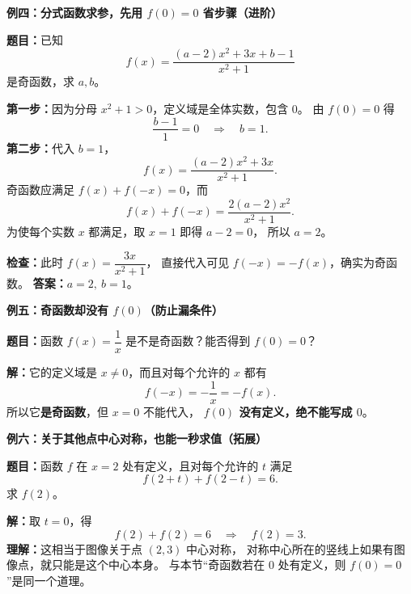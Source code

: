 \clearpage
\begin{examplebox}
\textbf{\textcolor{CExample}{例四：分式函数求参，先用 $f(0)=0$ 省步骤（进阶）}}



  \textbf{题目：}已知
  \[
    f(x)=\frac{(a-2)x^2+3x+b-1}{x^2+1}
  \]
  是奇函数，求 $a,b$。

  \textbf{第一步：}因为分母 $x^2+1>0$，定义域是全体实数，包含 $0$。
  由 $f(0)=0$ 得
  \[
    \frac{b-1}{1}=0\quad\Longrightarrow\quad \boxed{b=1}.
  \]
  \textbf{第二步：}代入 $b=1$，
  \[
    f(x)=\frac{(a-2)x^2+3x}{x^2+1}.
  \]
  奇函数应满足 $f(x)+f(-x)=0$，而
  \[
    f(x)+f(-x)=\frac{2(a-2)x^2}{x^2+1}.
  \]
  为使每个实数 $x$ 都满足，取 $x=1$ 即得 $a-2=0$，
  所以 $\boxed{a=2}$。

  \textbf{检查：}此时 $f(x)=\dfrac{3x}{x^2+1}$，
  直接代入可见 $f(-x)=-f(x)$，确实为奇函数。
  \textbf{答案：}$\boxed{a=2,\ b=1}$。

  \medskip
  
\end{examplebox}
\clearpage
\begin{examplebox}
\textbf{\textcolor{CExample}{例五：奇函数却没有 $f(0)$（防止漏条件）}}



  \textbf{题目：}函数 $f(x)=\dfrac1x$ 是不是奇函数？能否得到 $f(0)=0$？

  \textbf{解：}它的定义域是 $x\ne0$，而且对每个允许的 $x$ 都有
  \[
    f(-x)=-\frac1x=-f(x).
  \]
  所以它\textbf{是奇函数}，但 $x=0$ 不能代入，
  \textbf{$f(0)$ 没有定义，绝不能写成 $0$}。

  \medskip
  
\end{examplebox}
\clearpage
\begin{examplebox}
\textbf{\textcolor{CExample}{例六：关于其他点中心对称，也能一秒求值（拓展）}}



  \textbf{题目：}函数 $f$ 在 $x=2$ 处有定义，且对每个允许的 $t$ 满足
  \[
    f(2+t)+f(2-t)=6.
  \]
  求 $f(2)$。

  \textbf{解：}取 $t=0$，得
  \[
    f(2)+f(2)=6
    \quad\Longrightarrow\quad\boxed{f(2)=3}.
  \]
  \textbf{理解：}这相当于图像关于点 $(2,3)$ 中心对称，
  对称中心所在的竖线上如果有图像点，就只能是这个中心本身。
  与本节“奇函数若在 $0$ 处有定义，则 $f(0)=0$”是同一个道理。
\end{examplebox}
